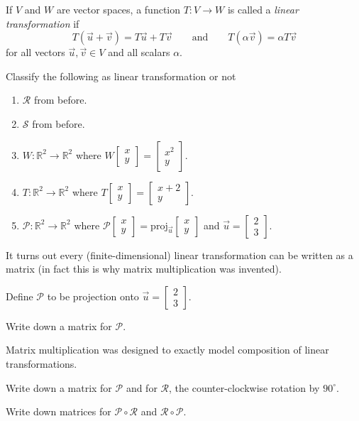 \documentclass[14pt]{problemset}
\newcommand{\R}{\mathbb{R}}
\newcommand{\proj}{\mathrm{proj}}
\newcommand{\mat}[1]{\begin{bmatrix}#1\end{bmatrix}}
\begin{document}
	\begin{definition}
		If $V$ and $W$ are vector spaces, a function $T:V\to W$ is called a \emph{linear transformation}
		if 
		\[
			T(\vec u+\vec v)=T\vec u+T\vec v \qquad\text{and}\qquad
			T(\alpha \vec v)=\alpha T\vec v
		\]
		for all vectors $\vec u,\vec v\in V$ and all scalars $\alpha$.
	\end{definition}

	\question
	\begin{parts}
		\item Classify the following as linear transformation or not
			\begin{enumerate}
				\item $\mathcal R$ from before.
				\item $\mathcal S$ from before.
				\item $W:\R^2\to\R^2$ where $W\mat{x\\y}=\mat{x^2\\y}$.
				\item $T:\R^2\to\R^2$ where $T\mat{x\\y}=\mat{x+2\\y}$.
				\item $\mathcal P:\R^2\to\R^2$ where $\mathcal P\mat{x\\y}=\proj_{\vec u}\mat{x\\y}$ and 
					$\vec u=\mat{2\\3}$.
			\end{enumerate}
	\end{parts}

	It turns out every (finite-dimensional) linear transformation can be written as a matrix (in fact
	this is why matrix multiplication was invented).

	\question
	Define $\mathcal P$ to be projection onto $\vec u=\mat{2\\3}$.
	\begin{parts}
		\item Write down a matrix for $\mathcal P$.
	\end{parts}

	Matrix multiplication was designed to exactly model composition of linear transformations.
	\begin{parts}[resume]
		\item Write down a matrix for $\mathcal P$ and for $\mathcal R$, the counter-clockwise rotation
			by $90^\circ$.
		\item Write down matrices for $\mathcal P\circ\mathcal R$ and $\mathcal R\circ \mathcal P$.
	\end{parts}
\end{document}
